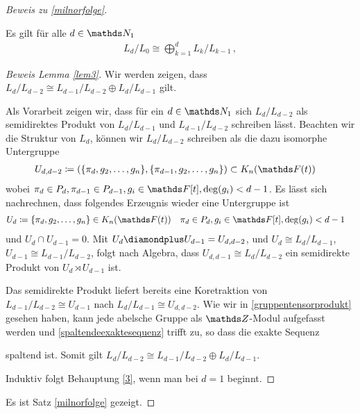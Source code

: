 \documentclass[ngerman,fontsize=11pt, paper=a4, parskip=half, titlepage=true, toc=bib]{scrartcl}
\begin{document}
\begin{proof}[Beweis zu \ref{milnorfolge}]
  \begin{Lem}\label{lem3}
    Es gilt für alle $d\in\N_1$
    \begin{gather}
      L_d/L_0\cong \bigoplus_{k=1}^d L_k/L_{k-1} \,,
    \end{gather}
  \end{Lem}
  \begin{proof}[Beweis Lemma \ref{lem3}]
    Wir werden zeigen, dass $L_d/L_{d-2}\cong L_{d-1}/L_{d-2}\oplus
    L_{d}/L_{d-1}$ gilt.
    
    Als Vorarbeit zeigen wir, dass für ein $d\in\N_1$ sich
    $L_d/L_{d-2}$ als semidirektes Produkt von $L_d/L_{d-1}$ und
    $L_{d-1}/L_{d-2}$ schreiben lässt.
    Beachten wir die Struktur von $L_d$, können wir $L_d/L_{d-2}$
    schreiben als die dazu isomorphe Untergruppe 
    \begin{align*}
      U_{d,{d-2}}
      &\coloneqq \left(
        \{\pi_d,g_2,\dotsc,g_n\},
        \{\pi_{d-1},g_2,\dotsc,g_n\}
        \right)\subset\KnFt
    \end{align*}
    wobei $\pi_{d}\in P_d, \pi_{d-1}\in P_{d-1}, 
    g_i\in\F[t],\deg(g_i)<d-1$.
    Es lässt sich nachrechnen, dass folgendes Erzeugnis wieder eine
    Untergruppe ist
    \begin{align*}
      U_d&\coloneqq \{\pi_d,g_2,\dotsc,g_n\}\in\KnFt
      &&\pi_{d}\in P_d, g_i\in\F[t],\deg(g_i)<d-1
    \end{align*}
    und $U_d\cap U_{d-1}=0$.
    Mit $U_d\p U_{d-1}= U_{d,d-2}$,
    und $U_d\cong L_d/L_{d-1}$, $U_{d-1}\cong L_{d-1}/L_{d-2}$,
    folgt nach Algebra, dass
    $U_{d,d-1}\cong L_d/L_{d-2}$ ein semidirekte Produkt von $U_d\rtimes U_{d-1}$
    ist.

    Das semidirekte Produkt liefert bereits eine Koretraktion von
    $L_{d-1}/L_{d-2}\cong U_{d-1}$ nach $L_d/L_{d-1}\cong U_{d,d-2}$.
    Wie wir in \ref{gruppentensorprodukt} gesehen haben, kann jede
    abelsche Gruppe als $\Z$-Modul aufgefasst werden und \ref{spaltendeexaktesequenz}
    trifft zu, so dass die exakte Sequenz
    \begin{center}
    \end{center}
    spaltend ist. Somit gilt $L_d/L_{d-2}\cong L_{d-1}/L_{d-2}\oplus
    L_d/L_{d-1}$.
    
    Induktiv folgt Behauptung \ref{3}, wenn man bei $d=1$ beginnt.
  \end{proof}
  
  Es ist Satz \ref{milnorfolge} gezeigt.
\end{proof}


\printindex

\nocite{*}
\printbibliography
\end{document}
